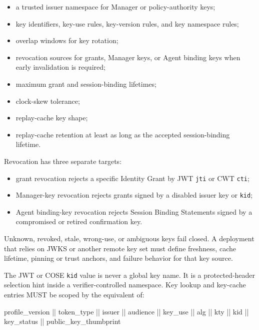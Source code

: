 \documentclass[
]{article}
\newenvironment{Shaded}{}{}
\newcommand{\NormalTok}[1]{#1}
\providecommand{\tightlist}{%
  \setlength{\itemsep}{0pt}\setlength{\parskip}{0pt}}
\begin{document}
\begin{itemize}
\tightlist
\item
  a trusted issuer namespace for Manager or policy-authority keys;
\item
  key identifiers, key-use rules, key-version rules, and key namespace
  rules;
\item
  overlap windows for key rotation;
\item
  revocation sources for grants, Manager keys, or Agent binding keys
  when early invalidation is required;
\item
  maximum grant and session-binding lifetimes;
\item
  clock-skew tolerance;
\item
  replay-cache key shape;
\item
  replay-cache retention at least as long as the accepted
  session-binding lifetime.
\end{itemize}

Revocation has three separate targets:

\begin{itemize}
\tightlist
\item
  grant revocation rejects a specific Identity Grant by JWT \texttt{jti}
  or CWT \texttt{cti};
\item
  Manager-key revocation rejects grants signed by a disabled issuer key
  or \texttt{kid};
\item
  Agent binding-key revocation rejects Session Binding Statements signed
  by a compromised or retired confirmation key.
\end{itemize}

Unknown, revoked, stale, wrong-use, or ambiguous keys fail closed. A
deployment that relies on JWKS or another remote key set must define
freshness, cache lifetime, pinning or trust anchors, and failure
behavior for that key source.

The JWT or COSE \texttt{kid} value is never a global key name. It is a
protected-header selection hint inside a verifier-controlled namespace.
Key lookup and key-cache entries MUST be scoped by the equivalent of:

\begin{Shaded}
\begin{Highlighting}[]
\NormalTok{profile_version || token_type || issuer || audience ||}
\NormalTok{key_use || alg || kty || kid || key_status || public_key_thumbprint}
\end{Highlighting}
\end{Shaded}
\end{document}
